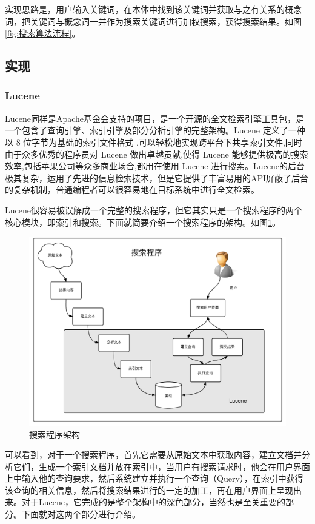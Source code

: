 \documentclass[12pt,a4paper]{article}
\begin{document}
	实现思路是，用户输入关键词，在本体中找到该关键词并获取与之有关系的概念词，把关键词与概念词一并作为搜索关键词进行加权搜索，获得搜索结果。如图\ref{fig:搜索算法流程}。
	
	\subsection{实现}
		\subsubsection{Lucene}
	Lucene同样是Apache基金会支持的项目，是一个开源的全文检索引擎工具包，是一个包含了查询引擎、索引引擎及部分分析引擎的完整架构。Lucene 定义了一种以 8 位字节为基础的索引文件格式 ,可以轻松地实现跨平台下共享索引文件,同时由于众多优秀的程序员对 Lucene 做出卓越贡献,使得 Lucene 能够提供极高的搜索效率,包括苹果公司等众多商业场合,都用在使用 Lucene 进行搜索。Lucene的后台极其复杂，运用了先进的信息检索技术，但是它提供了丰富易用的API屏蔽了后台的复杂机制，普通编程者可以很容易地在目标系统中进行全文检索。
	
	Lucene很容易被误解成一个完整的搜索程序，但它其实只是一个搜索程序的两个核心模块，即索引和搜索。下面就简要介绍一个搜索程序的架构。如图\ref{fig:搜索程序架构}。
	
	\begin{figure}[htbp] 
	\centering\includegraphics[width=5in]{fig/SearchEngineFrame.png} 
	\caption{搜索程序架构}\label{fig:搜索程序架构} 
	\end{figure} 
	
	可以看到，对于一个搜索程序，首先它需要从原始文本中获取内容，建立文档并分析它们，生成一个索引文档并放在索引中，当用户有搜索请求时，他会在用户界面上中输入他的查询要求，然后系统建立并执行一个查询（Query），在索引中获得该查询的相关信息，然后将搜索结果进行的一定的加工，再在用户界面上呈现出来。对于Lucene，它完成的是整个架构中的深色部分，当然也是至关重要的部分。下面就对这两个部分进行介绍。	
	
\end{document}
